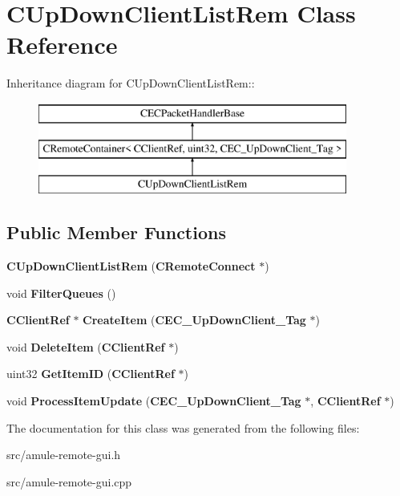 \section{CUpDownClientListRem Class Reference}
\label{classCUpDownClientListRem}
Inheritance diagram for CUpDownClientListRem::\begin{figure}[H]
\begin{center}
\leavevmode
\includegraphics[height=3cm]{classCUpDownClientListRem}
\end{center}
\end{figure}
\subsection*{Public Member Functions}
\begin{DoxyCompactItemize}
\item 
{\bfseries CUpDownClientListRem} ({\bf CRemoteConnect} $\ast$)\label{classCUpDownClientListRem_a410e9e194d7318e7c04bbefc07278ca5}

\item 
void {\bfseries FilterQueues} ()\label{classCUpDownClientListRem_a5341bfcad01e05bfee8aa02ada43f249}

\item 
{\bf CClientRef} $\ast$ {\bfseries CreateItem} ({\bf CEC\_\-UpDownClient\_\-Tag} $\ast$)\label{classCUpDownClientListRem_a5f74a8c998e5e045380836d5c90a9773}

\item 
void {\bfseries DeleteItem} ({\bf CClientRef} $\ast$)\label{classCUpDownClientListRem_ab317dbe651f92d3cfa61c3cd84bc0876}

\item 
uint32 {\bfseries GetItemID} ({\bf CClientRef} $\ast$)\label{classCUpDownClientListRem_a2537fc1f7dd6a53da9bcb24a03f2ce1d}

\item 
void {\bfseries ProcessItemUpdate} ({\bf CEC\_\-UpDownClient\_\-Tag} $\ast$, {\bf CClientRef} $\ast$)\label{classCUpDownClientListRem_a4f038cd24747cd43e98290d1a46e4d8f}

\end{DoxyCompactItemize}


The documentation for this class was generated from the following files:\begin{DoxyCompactItemize}
\item 
src/amule-\/remote-\/gui.h\item 
src/amule-\/remote-\/gui.cpp\end{DoxyCompactItemize}
